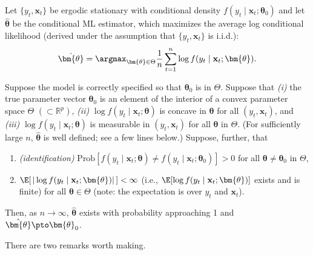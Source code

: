 \begin{proposition}
\label{prop:7.6}
Let $\{y_t, \mathbf{x}_t\}$ be ergodic stationary with conditional density $f(y_t \mid \mathbf{x}_t; \bm{\theta}_0)$ and let $\hat{\bm{\theta}}$ be the conditional ML estimator, which maximizes the average log conditional likelihood (derived under the assumption that $\{y_t, \mathbf{x}_t\}$ is i.i.d.):
\[
\hat{\bm{\theta}} = \argmax_{\bm{\theta} \in \Theta} \frac{1}{n} \sum_{t=1}^{n} \log f(y_t \mid \mathbf{x}_t; \bm{\theta}).
\]

Suppose the model is correctly specified so that $\bm{\theta}_0$ is in $\Theta$. Suppose that \emph{(i)} the true parameter vector $\bm{\theta}_0$ is an element of the interior of a convex parameter space $\Theta$ $(\subset \mathbb{R}^p)$, \emph{(ii)} $\log f(y_t \mid \mathbf{x}_t; \bm{\theta})$ is concave in $\bm{\theta}$ for all $(y_t, \mathbf{x}_t)$, and \emph{(iii)} $\log f(y_t \mid \mathbf{x}_t; \bm{\theta})$ is measurable in $(y_t, \mathbf{x}_t)$ for all $\bm{\theta}$ in $\Theta$. (For sufficiently large $n$, $\hat{\bm{\theta}}$ is well defined; see a few lines below.) Suppose, further, that
\begin{enumerate}[label=(\alph*)]
\item \emph{(identification)} \enspace $\text{Prob}[f(y_t \mid \mathbf{x}_t; \bm{\theta}) \neq f(y_t \mid \mathbf{x}_t; \bm{\theta}_0)] > 0$ for all $\bm{\theta} \neq \bm{\theta}_0$ in $\Theta$,
\item $\E[\,|\log f(y_t \mid \mathbf{x}_t; \bm{\theta})|\,] < \infty$ (i.e., $\E[\log f(y_t \mid \mathbf{x}_t; \bm{\theta})]$ exists and is finite) for all $\bm{\theta} \in \Theta$ (note: the expectation is over $y_t$ and $\mathbf{x}_t$).
\end{enumerate}
Then, as $n \to \infty$, $\hat{\bm{\theta}}$ exists with probability approaching 1 and $\hat{\bm{\theta}} \pto \bm{\theta}_0$.
\end{proposition}

There are two remarks worth making.

